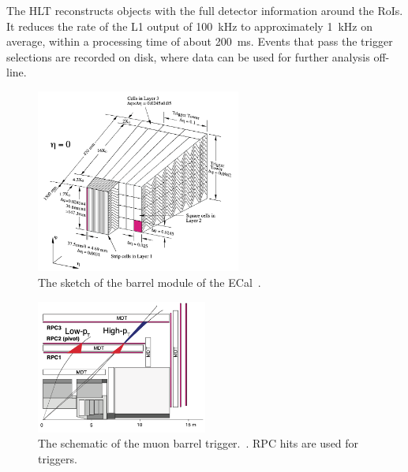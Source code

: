 The HLT reconstructs objects with the full detector information around the RoIs. 
It reduces the rate of the L1 output of 100~kHz to approximately 1~kHz on average, within a processing time of about 200~ms.
Events that pass the trigger selections are recorded on disk, where data can be used for further analysis off-line.
\begin{figure}[tbp]
\begin{center}
 \includegraphics[width=0.6\textwidth,keepaspectratio]{figures/detector/TriggerTower}
\caption{
The sketch of the barrel module of the ECal~\cite{PERF-2007-01}.
}
\label{fig:TriggerTower}
\end{center}
\end{figure}

\begin{figure}[tbp]
\centering
\begin{center}
 \includegraphics[width=0.5\textwidth,keepaspectratio]{figures/detector/muontrigger}
\caption{
The schematic of the muon barrel trigger.~\cite{PERF-2007-01}. RPC hits are used for triggers.
}
\label{fig:muontrigger}
\end{center}
\end{figure}

